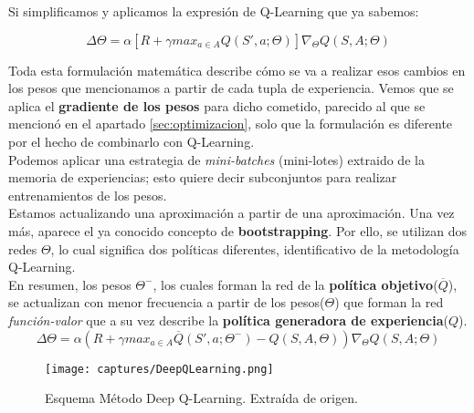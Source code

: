 \documentclass[11pt,fleqn]{book} %
\begin{document}
Si simplificamos y aplicamos la expresión de Q-Learning que ya sabemos:

\begin{equation*}
\Delta\Theta=\alpha\left[R+\gamma max_{a \in A} Q(S',a;\Theta)\right]\nabla_\Theta Q(S,A;\Theta) 
\end{equation*}

Toda esta formulación matemática describe cómo se va a realizar esos cambios en los pesos que mencionamos a partir de cada tupla de experiencia. Vemos que se aplica el \textbf{gradiente de los pesos} para dicho cometido, parecido al que se mencionó en el apartado \ref{sec:optimizacion}, solo que la formulación es diferente por el hecho de combinarlo con Q-Learning.\\

Podemos aplicar una estrategia de \textit{mini-batches} (mini-lotes) extraido de la memoria de experiencias; esto quiere decir subconjuntos para realizar entrenamientos de los pesos.  \\

Estamos actualizando una aproximación a partir de una aproximación. Una vez más, aparece el ya conocido concepto de \textbf{bootstrapping}. Por ello, se utilizan dos redes $\Theta$, lo cual significa dos políticas diferentes, identificativo de la metodología Q-Learning. \\

En resumen, los pesos $\Theta^-$, los cuales forman la red de la \textbf{política objetivo}($\overline{Q}$), se actualizan con menor frecuencia a partir de los pesos($\Theta$) que forman la red \textit{función-valor} que a su vez describe la \textbf{política generadora de experiencia}($Q$). \\

\begin{equation*}
\Delta\Theta=\alpha(R+\gamma max_{a \in A} \overline{Q}(S',a;\Theta^-)-Q(S,A,\Theta))\nabla_\Theta Q(S,A;\Theta)
\end{equation*}

\begin{figure}[H]
	\centering\texttt{[image: captures/DeepQLearning.png]}
	\caption{Esquema Método Deep Q-Learning. Extraída de origen. \cite{book:barto} \cite{article:RLromero}}
	\label{fig:deepqlearning} %
\end{figure}
\end{document}

